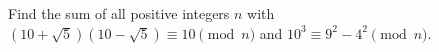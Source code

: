 Find the sum of all positive integers $n$ with $\left(10+\sqrt5\right)\left(10-\sqrt5\right)\equiv10\pmod n$ and $10^3\equiv9^2-4^2\pmod n$.
